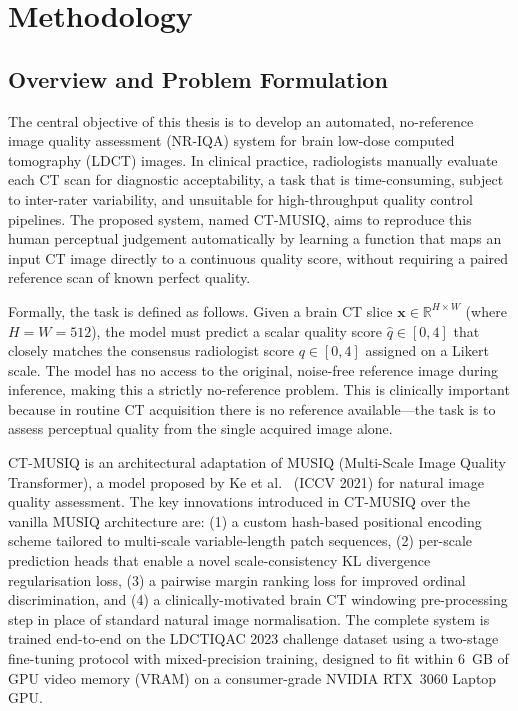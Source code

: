 
\chapter{Methodology}
\label{chap:methodology}

\section{Overview and Problem Formulation}
\label{sec:method_overview}

The central objective of this thesis is to develop an automated, no-reference image quality
assessment (NR-IQA) system for brain low-dose computed tomography (LDCT) images.
In clinical practice, radiologists manually evaluate each CT scan for diagnostic
acceptability, a task that is time-consuming, subject to inter-rater variability, and
unsuitable for high-throughput quality control pipelines. The proposed system, named
CT-MUSIQ, aims to reproduce this human perceptual judgement automatically by learning
a function that maps an input CT image directly to a continuous quality score, without
requiring a paired reference scan of known perfect quality.

Formally, the task is defined as follows. Given a brain CT slice
$\mathbf{x} \in \mathbb{R}^{H \times W}$ (where $H = W = 512$), the model must predict
a scalar quality score $\hat{q} \in [0, 4]$ that closely matches the consensus radiologist
score $q \in [0, 4]$ assigned on a Likert scale. The model has no access to the original,
noise-free reference image during inference, making this a strictly no-reference problem.
This is clinically important because in routine CT acquisition there is no reference
available---the task is to assess perceptual quality from the single acquired image alone.

CT-MUSIQ is an architectural adaptation of MUSIQ (Multi-Scale Image Quality Transformer),
a model proposed by Ke et al.\ \cite{ke2021musiq} (ICCV 2021) for natural image quality
assessment. The key innovations introduced in CT-MUSIQ over the vanilla MUSIQ architecture
are: (1) a custom hash-based positional encoding scheme tailored to multi-scale
variable-length patch sequences, (2) per-scale prediction heads that enable a novel
scale-consistency KL divergence regularisation loss, (3) a pairwise margin ranking loss
for improved ordinal discrimination, and (4) a clinically-motivated brain CT windowing
pre-processing step in place of standard natural image normalisation. The complete system
is trained end-to-end on the LDCTIQAC 2023 challenge dataset \cite{lee2025ldctiqac}
using a two-stage fine-tuning protocol with mixed-precision training, designed to fit
within 6~GB of GPU video memory (VRAM) on a consumer-grade NVIDIA RTX~3060 Laptop GPU.

